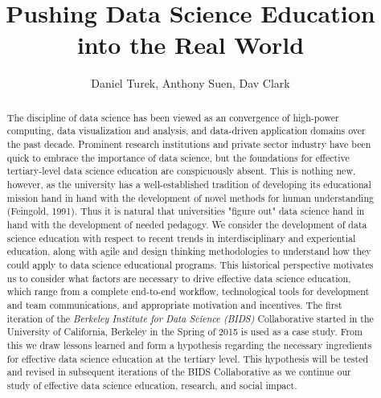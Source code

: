 \documentclass{sig-alternate}
\begin{document}
\title{Pushing Data Science Education into the Real World }
\author{Daniel Turek, Anthony Suen, Dav Clark}
\date{}
\maketitle

\vspace{0.5in}

\begin{abstract}
The discipline of data science has been viewed as an convergence of high-power computing, data visualization and analysis, and data-driven application domains over the past decade.  Prominent research institutions and private sector industry have been quick to embrace the importance of data science, but the foundations for effective tertiary-level data science education are conspicuously absent. This is nothing new, however, as the university has a well-established tradition of developing its educational mission hand in hand with the development of novel methods for human understanding (Feingold, 1991). Thus it is natural that universities "figure out" data science hand in hand with the development of needed pedagogy. We consider the development of data science education with respect to recent trends in interdisciplinary and experiential education, along with agile and design thinking methodologies to understand how they could apply to data science educational programs. This historical perspective motivates us to consider what factors are necessary to drive effective data science education, which range from a complete end-to-end workflow, technological tools for development and team communications, and appropriate motivation and incentives. The first iteration of the \emph{Berkeley Institute for Data Science (BIDS)} Collaborative started in the University of California, Berkeley in the Spring of 2015 is used as a case study. From this we draw lessons learned and form a hypothesis regarding the necessary ingredients for effective data science education at the tertiary level.  This hypothesis will be tested and revised in subsequent iterations of the BIDS Collaborative as we continue our study of effective data science education, research, and social impact.
\end{abstract}

\thispagestyle{empty}
\end{document}
